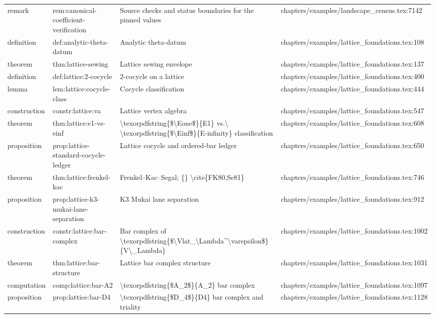 \documentclass[11pt]{article}
\begin{document}
\begin{longtable}{L{0.10\textwidth}L{0.26\textwidth}L{0.42\textwidth}L{0.22\textwidth}}
remark & rem:canonical-coefficient-verification & Source checks and stat{}us boundaries for the pinned values & chapters/examples/landscape\_census.tex:7142\\
definition & def:analytic-theta-datum & Analytic theta-datum & chapters/examples/lattice\_foundations.tex:108\\
theorem & thm:lattice-sewing & Lattice sewing envelope & chapters/examples/lattice\_foundations.tex:137\\
definition & def:lattice:2-cocycle & 2-cocycle on a lattice & chapters/examples/lattice\_foundations.tex:400\\
lemma & lem:lattice:cocycle-class & Cocycle classification & chapters/examples/lattice\_foundations.tex:444\\
construction & constr:lattice:va & Lattice vertex algebra & chapters/examples/lattice\_foundations.tex:547\\
theorem & thm:lattice:e1-vs-einf & \textbackslash{}texorpdfstring\{\$\textbackslash{}Eone\$\}\{E1\} vs.\textbackslash{} \textbackslash{}texorpdfstring\{\$\textbackslash{}Einf\$\}\{E-infinity\} classification & chapters/examples/lattice\_foundations.tex:608\\
proposition & prop:lattice-standard-cocycle-led{}ger & Lattice cocycle and ordered-bar led{}ger & chapters/examples/lattice\_foundations.tex:650\\
theorem & thm:lattice:frenkel-kac & Frenkel--Kac--Segal; \{\} \textbackslash{}cite\{FK80,Se81\} & chapters/examples/lattice\_foundations.tex:746\\
proposition & prop:lattice-k3-mukai-lane-separation & K3 Mukai lane separation & chapters/examples/lattice\_foundations.tex:912\\
construction & constr:lattice:bar-complex & Bar complex of \textbackslash{}texorpdfstring\{\$\textbackslash{}Vlat\_\textbackslash{}Lambda\textasciicircum{}\textbackslash{}varepsilon\$\}\{V\textbackslash{}\_Lambda\} & chapters/examples/lattice\_foundations.tex:1002\\
theorem & thm:lattice:bar-structure & Lattice bar complex structure & chapters/examples/lattice\_foundations.tex:1031\\
computation & comp:lattice:bar-A2 & \textbackslash{}texorpdfstring\{\$A\_2\$\}\{A\_2\} bar complex & chapters/examples/lattice\_foundations.tex:1097\\
proposition & prop:lattice:bar-D4 & \textbackslash{}texorpdfstring\{\$D\_4\$\}\{D4\} bar complex and triality & chapters/examples/lattice\_foundations.tex:1128\\

\end{longtable}
\end{document}
